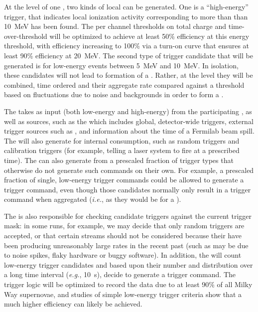 At the level of one , two kinds of local
 can be generated.
One is a ``high-energy'' trigger, that indicates local ionization
activity corresponding to more than than \SI{10}{\MeV} has been found.
The per channel thresholds on total charge and time-over-threshold
will be optimized to achieve at least 50\% efficiency at this energy
threshold, with efficiency increasing to 100\% via a turn-on curve
that ensures at least 90\% efficiency at \SI{20}{\MeV}. 
The second type of trigger candidate that will be generated is for
low-energy events between \SI{5}{\MeV} and \SI{10}{\MeV}. 
In isolation, these candidates will not lead to formation of a
. 
Rather, at the  level they will be combined, time
ordered and their aggregate rate compared against a threshold based on
fluctuations due to noise and backgrounds in order to form a
 .

The  takes as input  (both low-energy
and high-energy) from the participating , as well as
 sources, such as the  which includes
global, detector-wide triggers, external trigger sources such as
, and information about the time of a Fermilab beam
spill. 
The  will also generate  for internal
consumption, such as random triggers and calibration triggers (for
example, telling a laser system to fire at a prescribed time). 
The  can also generate  from a
prescaled fraction of trigger types that otherwise do not generate
such commands on their own. 
For example, a prescaled fraction of single, low-energy trigger
commands could be allowed to generate a trigger command, even though
those candidates normally only result in a trigger command when
aggregated ({\it i.e.}, as they would be for a ).


The  is also responsible for checking candidate triggers
against the current  trigger mask: in some runs, for
example, we may decide that only random triggers are accepted, or that
certain  streams should not be considered
because their  have been producing unreasonably large
rates in the recent past (such as may be due to noise spikes, flaky
hardware or buggy software).
In addition, the  will count low-energy trigger candidates
and based upon their number and distribution over a long time interval
({\it e.g.}, \SI{10}{\s}), decide to generate a  trigger command.
The trigger logic will be optimized to record the data due to at least
90\% of all Milky Way supernovae, and studies of simple low-energy
trigger criteria show that a much higher efficiency can likely be
achieved.


